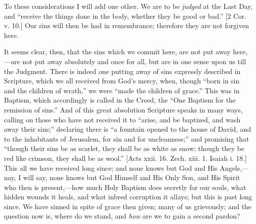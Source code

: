 To these considerations I will add one other. We are to be \emph{judged}
at the Last Day, and ``receive the things done in the body,
whether they be good or bad.'' [2 Cor. v. 10.] Our sins will then
be had in remembrance; therefore they are not forgiven here.

It seems clear, then, that the sins which we commit here, are not
put away here,—are not put away absolutely and once for all, but are
in one sense upon us till the Judgment. There is indeed one putting
away of sins expressly described in Scripture, which we all received
from God's mercy, when, though ``born in sin and the children of
wrath,'' we were ``made the children of grace.'' This was
in Baptism, which accordingly is called in the Creed, the ``One
Baptism for the remission of sins.'' And of this great absolution
Scripture speaks in many ways, calling on those who have not received
it to ``arise, and be baptized, and wash away their sins;''
declaring there is ``a fountain opened to the house of David, and
to the inhabitants of Jerusalem, for sin and for uncleanness;''
and promising that ``though their sins be as scarlet, they shall
be as white as snow; though they be red like crimson, they shall be as
wool.'' [Acts xxii. 16. Zech. xiii. 1. Isaiah i. 18.] This all we
have received long since; and none knows but God and His Angels,—nay,
I will say, none knows but God Himself and His Only Son, and His
Spirit who then is present,—how much Holy Baptism does secretly for
our souls, what hidden wounds it heals, and what inbred corruption it
allays; but this is past long since. We have sinned in spite of grace
then given; many of us grievously; and the question now is, where do
we stand, and \emph{how} are we to gain a second pardon?

